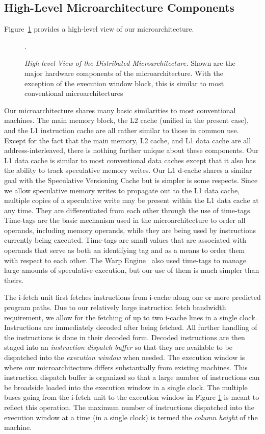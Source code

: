 \documentclass[10pt,twocolumn,dvips]{article}
\begin{document}
\subsection{High-Level Microarchitecture Components}
%
Figure~\ref{fig:high} provides a high-level view of our microarchitecture.
%
\begin{figure}
\centering
{}
\caption{{\em High-level View of the Distributed Microarchitecture.} 
Shown are the major hardware components of the microarchitecture.
With the exception of the 
execution window block, this is similar to most conventional
microarchitectures}.
\label{fig:high}
\end{figure}
%
Our microarchitecture shares many basic 
similarities to most conventional
machines.
The main memory block,
the L2 cache (unified in the present case), and the L1 instruction 
cache are all rather similar to those in common use.
Except for the fact that the main memory, L2 cache, and L1 data
cache are all address-interleaved, there is nothing further
unique about these components. 
Our L1 data cache is similar to
most conventional data caches except that it also has the ability to
track speculative memory writes.
Our L1 d-cache shares a similar goal with the 
Speculative Versioning Cache \cite{Gop98} 
but is simpler is some respects.
Since we allow speculative memory writes to propagate
out to the L1 data cache, multiple copies
of a speculative write may be present within the L1 data cache
at any time.  They are differentiated from each other
through the use of time-tags.  Time-tags are the basic mechanism
used in the microarchitecture to order all operands, including
memory operands, while they are being used by instructions
currently being executed.  Time-tags are small values that
are associated with operands that serve as both an identifying
tag and as a means to order them with respect to each other.
The Warp Engine~\cite{Cle95}
also used time-tags to manage large amounts of speculative execution,
but our use of them is much simpler than theirs.

The i-fetch unit first fetches instructions from i-cache
along one or more predicted program paths.
Due to our relatively large instruction fetch bandwidth
requirement, we allow for the fetching of up to two i-cache
lines in a single clock.
Instructions are immediately
decoded after being fetched.
All further handling of the instructions is done in their decoded
form.
Decoded instructions are then staged
into an \textit{instruction dispatch buffer}
so that they are available to be dispatched
into the \textit{execution window} when needed.  
The execution window is where
our microarchitecture differs substantially from existing machines.
This instruction dispatch buffer is organized so that
a large number of instructions can be broadside loaded into the
execution window in a single clock.
The multiple buses going from the i-fetch unit to the
execution window in Figure \ref{fig:high} is meant to
reflect this operation.  
The maximum number of instructions dispatched into the
execution window at a time (in a single clock) is termed
the \textit{column height} of the machine.  
%
%
\end{document}
